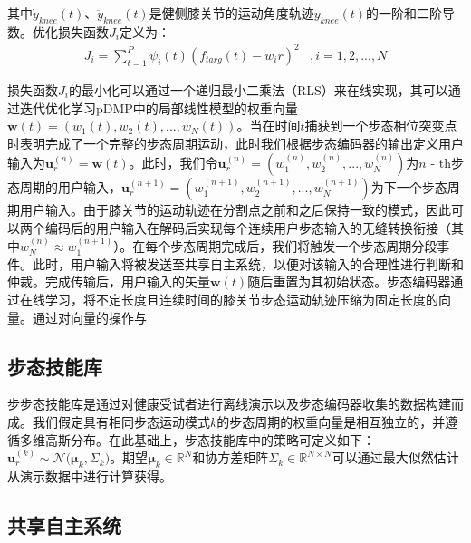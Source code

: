 其中${\dot y_{knee}}(t)$、${\ddot y_{knee}}(t)$是健侧膝关节的运动角度轨迹${y_{knee}}(t)$的一阶和二阶导数。优化损失函数${J_i}$定义为：
\begin{equation}
  \label{deqn_ex12}
  \begin{array}{*{20}{c}}
    {{J_i} = \sum\limits_{t = 1}^P {{\psi _i}} (t){{\left( {{f_{targ}}(t) - {w_i}r} \right)}^2}}&{,i = 1,2,...,N} 
  \end{array}
\end{equation}       

损失函数${J_i}$的最小化可以通过一个递归最小二乘法（RLS）来在线实现，其可以通过迭代优化学习pDMP中的局部线性模型的权重向量$\pmb{w}(t)=({w_1}(t),{w_2}(t),...,{w_N}(t))$。当在时间$t$捕获到一个步态相位突变点时表明完成了一个完整的步态周期运动，此时我们根据步态编码器的输出定义用户输入为$\pmb{u}_r^{(n)} = \pmb{w}(t)$。此时，我们令$\pmb{u}_r^{(n)} = (w_1^{(n)},w_2^{(n)},...,w_N^{(n)})$为$n{\text{ - th}}$步态周期的用户输入，$\pmb{u}_r^{(n + 1)} = (w_1^{(n + 1)},w_2^{(n + 1)},...,w_N^{(n + 1)})$为下一个步态周期用户输入。由于膝关节的运动轨迹在分割点之前和之后保持一致的模式，因此可以两个编码后的用户输入在解码后实现每个连续用户步态输入的无缝转换衔接（其中$w_N^{(n)}\approx w_1^{(n+1)}$）。在每个步态周期完成后，我们将触发一个步态周期分段事件。此时，用户输入将被发送至共享自主系统，以便对该输入的合理性进行判断和仲裁。完成传输后，用户输入的矢量$\pmb{w}(t)$随后重置为其初始状态。步态编码器通过在线学习，将不定长度且连续时间的膝关节步态运动轨迹压缩为固定长度的向量。通过对向量的操作与

\subsection{步态技能库}步步态技能库是通过对健康受试者进行离线演示以及步态编码器收集的数据构建而成。我们假定具有相同步态运动模式$ k $的步态周期的权重向量是相互独立的，并遵循多维高斯分布。在此基础上，步态技能库中的策略可定义如下：$\pmb{u}_r^{(k)}\sim {\mathcal{N}}\pmb{(}{{\pmb{\mu }}_k},{\Sigma _k}\pmb{)}$。期望${{\pmb{\mu }}_k} \in {\mathbb{R}^N}$和协方差矩阵${\Sigma _k} \in {\mathbb{R}^{N \times N}}$可以通过最大似然估计从演示数据中进行计算获得。  
\subsection{共享自主系统}
